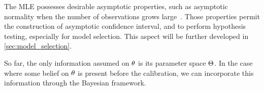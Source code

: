\documentclass[../../Main_ManuscritThese.tex]{subfiles}
\begin{document}
The MLE possesses desirable asymptotic properties, such as asymptotic
normality when the number of observations grows
large~\citep{reid_aspects_2013}. Those properties permit the
construction of asymptotic confidence interval, and to perform
hypothesis testing, especially for model selection. This aspect will
be further developed in \cref{sec:model_selection}.


So far, the only information assumed on $\theta$ is its parameter space
$\Theta$. In the case where some belief on $\theta$ is present before
the calibration, we can incorporate this information through the
Bayesian framework.
\end{document}
